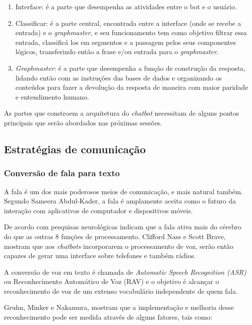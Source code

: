 \documentclass[
	12pt,				%
	oneside,
	a4paper,			%
	english,			%
	french,				%
	spanish,			%
	brazil				%
	]{abntex2}
\begin{document}
\begin{enumerate}
	\item Interface: é a parte que desempenha as atividades entre o bot e o usuário.
	\item Classificar: é a parte central, encontrada entre a interface (onde se recebe a entrada) e o \emph{graphmaster}, e seu funcionamento tem como objetivo filtrar essa entrada, classificá los em segmentos e a passagem pelos seus componentes lógicos, transferindo então a frase e/ou entrada para o \emph{graphmaster}.
	\item \emph{Graphmaster}: é a parte que desempenha a função de construção da resposta, lidando então com as instruções das bases de dados e organizando os conteúdos para fazer a devolução da resposta de maneira com maior paridade e entendimento humano.
\end{enumerate}

As partes que constroem a arquitetura do \emph{chatbot} necessitam de alguns pontos principais que serão abordados nas próximas sessões.

\subsection{Estratégias de comunicação}
\subsubsection{Conversão de fala para texto}
A fala é um dos mais poderosos meios de comunicação, e mais natural também. Segundo Sameera Abdul-Kader\supercite{Abdul-Kader2015}, a fala é amplamente aceita como o futuro da interação com aplicativos de computador e dispositivos móveis.
 
De acordo com pesquisas neurológicas indicam que a fala ativa mais do cérebro do que as outras 8 funções de processamento. Clifford Nass e Scott Brave\supercite{wired-for-speech}, mostram que aos \emph{chatbots} incorporarem o processamento de voz, serão então capazes de gerar uma interface sobre telefones e também rádios.
 
A conversão de voz em texto é chamada de \emph{Automatic Speech Recognition (ASR)} ou Reconhecimento Automático de Voz (RAV) e o objetivo é alcançar o reconhecimento de voz de um extenso vocabulário independente de quem fala.

Gruhn, Minker e Nakamura\supercite{wired-for-speech-2}, mostram que a implementação e melhoria desse reconhecimento pode ser medida através de alguns fatores, tais como:
\end{document}
